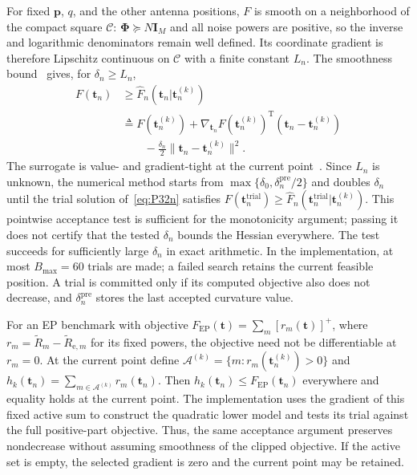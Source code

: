 \documentclass[journal]{IEEEtran}
\newcommand{\bt}{\mathbf{t}}
\newcommand{\bI}{\mathbf{I}}
\newcommand{\bp}{\mathbf{p}}
\newcommand{\bPhi}{\boldsymbol{\Phi}}
\begin{document}
For fixed $\bp$, $q$, and the other antenna positions, $F$ is smooth on a neighborhood of the compact square $\mathcal C$: $\bPhi\succeq N\bI_M$ and all noise powers are positive, so the inverse and logarithmic denominators remain well defined. Its coordinate gradient is therefore Lipschitz continuous on $\mathcal C$ with a finite constant $L_n$. The smoothness bound~\cite[Lemma~5.7]{Beck2017} gives, for $\delta_n\ge L_n$,
\begin{align}
F(\bt_n)&\ge\hat F_n(\bt_n|\bt_n^{(k)})\nonumber\\
&\triangleq F(\bt_n^{(k)})
 +\nabla_{\bt_n}F(\bt_n^{(k)})^{\mathrm{T}}
 (\bt_n-\bt_n^{(k)})\nonumber\\
&\qquad-\frac{\delta_n}{2}
 \|\bt_n-\bt_n^{(k)}\|^2.
\label{eq:surrogate}
\end{align}
The surrogate is value- and gradient-tight at the current point~\cite{Sun2017}. Since $L_n$ is unknown, the numerical method starts from $\max\{\delta_0,\delta_n^{\mathrm{pre}}/2\}$ and doubles $\delta_n$ until the trial solution of~\eqref{eq:P32n} satisfies $F(\bt_n^{\mathrm{trial}})\ge\hat F_n(\bt_n^{\mathrm{trial}}|\bt_n^{(k)})$. This pointwise acceptance test is sufficient for the monotonicity argument; passing it does not certify that the tested $\delta_n$ bounds the Hessian everywhere. The test succeeds for sufficiently large $\delta_n$ in exact arithmetic. In the implementation, at most $B_{\mathrm{max}}=60$ trials are made; a failed search retains the current feasible position. A trial is committed only if its computed objective also does not decrease, and $\delta_n^{\mathrm{pre}}$ stores the last accepted curvature value.

For an EP benchmark with objective $F_{\mathrm{EP}}(\bt)=\sum_m[r_m(\bt)]^+$, where $r_m=\tilde R_m-\tilde R_{\mathrm{e},m}$ for its fixed powers, the objective need not be differentiable at $r_m=0$. At the current point define $\mathcal A^{(k)}=\{m:r_m(\bt_n^{(k)})>0\}$ and $h_k(\bt_n)=\sum_{m\in\mathcal A^{(k)}}r_m(\bt_n)$. Then $h_k(\bt_n)\le F_{\mathrm{EP}}(\bt_n)$ everywhere and equality holds at the current point. The implementation uses the gradient of this fixed active sum to construct the quadratic lower model and tests its trial against the full positive-part objective. Thus, the same acceptance argument preserves nondecrease without assuming smoothness of the clipped objective. If the active set is empty, the selected gradient is zero and the current point may be retained.
\end{document}

